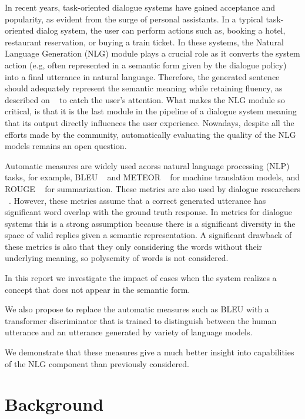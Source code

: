 \documentclass[11pt]{article}
\begin{document}
In recent years, task-oriented dialogue systems have gained acceptance and popularity, as evident from the surge of personal assistants. In a typical task-oriented dialog system, the user can perform actions such as, booking a hotel, restaurant reservation, or buying a train ticket. In these systems, the Natural Language Generation (NLG) module plays a crucial role as it  converts the system action (e.g, often represented in a semantic form given by the dialogue policy) into a final utterance in natural language. Therefore, the generated sentence should adequately represent the semantic meaning while retaining fluency, as described on ~\cite{stent2005} to catch the user's attention. What makes the NLG module so critical, is that it is the last module in the pipeline of a dialogue system meaning that its output directly influences the user experience. Nowadays, despite all the efforts made by the community, automatically evaluating the quality of the NLG  models remains an open question.

Automatic measures are widely used acorss natural language processing (NLP) tasks, for example, BLEU ~\cite{Papineni2002} and METEOR ~\cite{banerjee2005} for machine translation models, and ROUGE ~\cite{lin-2004-rouge} for summarization. These metrics are also used by dialogue researchers ~\cite{ritter2011data, Witteveen_2019, cai2020learning, wen-etal-2017-network, wen2015semantically}. However, these metrics assume that a correct generated utterance has significant word overlap with the ground truth response. In metrics for dialogue systems this is a strong assumption because there is a significant diversity in the space of valid replies given a semantic representation. A significant drawback of these metrics is also that they only considering the words without their underlying meaning, so polysemity of words is not considered. 

In this report we investigate the impact of cases when the system realizes a concept that does not appear in the semantic form.  

We also propose to replace the automatic measures such as BLEU with a transformer discriminator that is trained to distinguish between the human utterance and an utterance generated by variety of language models.

We demonstrate that these measures give a much better insight into capabilities of the NLG component than previously considered.

\section{Background}
\end{document}
